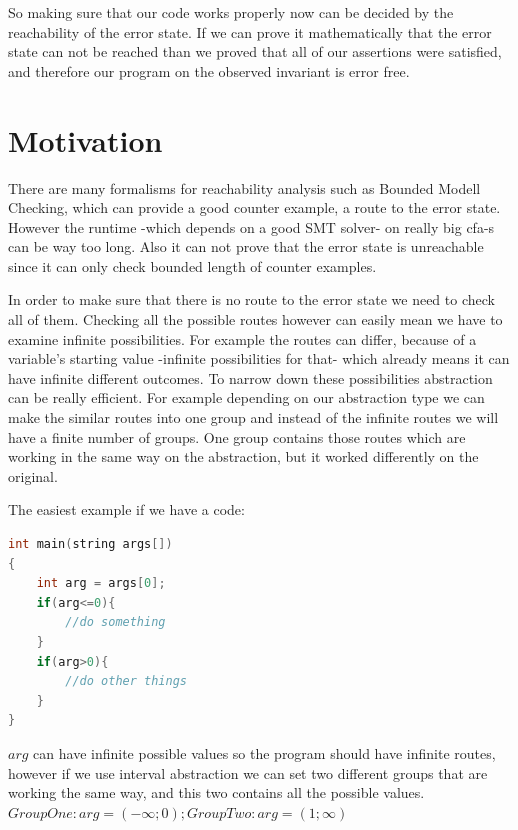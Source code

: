 So making sure that our code works properly now can be decided by the reachability of the error state. If we can prove it mathematically that the error state can not be reached than we proved that all of our assertions were satisfied, and therefore our program on the observed invariant is error free.


\section{Motivation}
\label{sec:motivation}
There are many formalisms for reachability analysis such as Bounded Modell Checking, which can provide a good counter example, a route to the error state. However the runtime -which depends on a good SMT solver- on really big cfa-s can be way too long. Also it can not prove that the error state is unreachable since it can only check bounded length of counter examples.

In order to make sure that there is no route to the error state we need to check all of them. Checking all the possible routes however can easily mean we have to examine infinite possibilities. For example the routes can differ, because of a variable's starting value -infinite possibilities for that- which already means it can have infinite different outcomes. To narrow down these possibilities abstraction can be really efficient. For example depending on our abstraction type we can make the similar routes into one group and instead of the infinite routes we will have a finite number of groups. One group contains those routes which are working in the same way on the abstraction, but it worked differently on the original.

The easiest example if we have a code:
\begin{lstlisting}[language=C,breaklines=true]
int main(string args[])
{
	int arg = args[0];
	if(arg<=0){
		//do something
	}
	if(arg>0){
		//do other things
	}	
}
\end{lstlisting}

$arg$ can have infinite possible values so the program should have infinite routes, however if we use interval abstraction we can set two different groups that are working the same way, and this two contains all the possible values. $GroupOne:arg=(-\infty;0); GroupTwo: arg=(1;\infty)$

